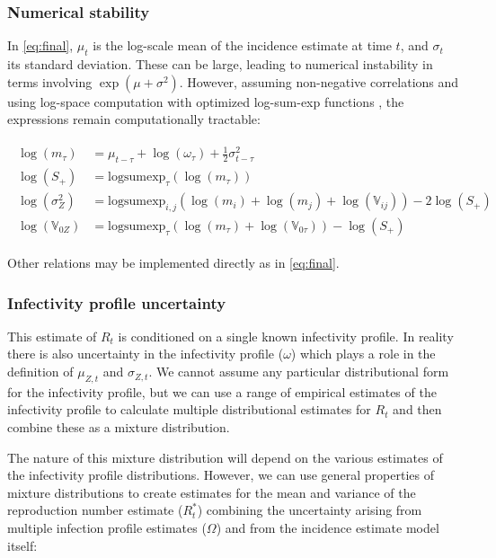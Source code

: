 \documentclass[10pt,letterpaper]{article}
\begin{document}
\subsubsection*{Numerical stability}

In \eqref{eq:final}, $\mu_t$ is the log-scale mean of the incidence estimate at time $t$, and $\sigma_t$ its standard deviation. These can be large, leading to numerical instability in terms involving $\exp(\mu + \sigma^2)$. However, assuming non-negative correlations and using log-space computation with optimized log-sum-exp functions \cite{blanchard2021}, the expressions remain computationally tractable:

\begin{eqnarray}
\begin{aligned}
\log(m_\tau) &= \mu_{t-\tau} + \log(\omega_\tau) + \frac{1}{2} \sigma_{t-\tau}^2 \\
\log(S_+) &= \text{logsumexp}_\tau(\log (m_\tau)) \\
\log(\sigma_Z^2) &= \text{logsumexp}_{i,j} \left( \log(m_i) + \log(m_j) + \log(\mathbb{V}_{ij}) \right) - 2 \log(S_+) \\
\log(\mathbb{V}_{0Z}) &= \text{logsumexp}_\tau \left( \log(m_\tau) + \log(\mathbb{V}_{0\tau}) \right) - \log(S_+)
\end{aligned}
\label{eq:logsumexp}
\end{eqnarray}

Other relations may be implemented directly as in \eqref{eq:final}.

\subsubsection*{Infectivity profile uncertainty}

This estimate of $R_t$ is conditioned on a single known infectivity profile. In reality there is also uncertainty in the infectivity profile ($\omega$) which plays a role in the definition of $\mu_{Z,t}$ and $\sigma_{Z,t}$. We cannot assume any particular distributional form for the infectivity profile, but we can use a range of empirical estimates of the infectivity profile to calculate multiple distributional estimates for $R_t$ and then combine these as a mixture distribution.

The nature of this mixture distribution will depend on the various estimates of the infectivity profile distributions. However, we can use general properties of mixture distributions to create estimates for the mean and variance of the reproduction number estimate ($R_t^*$) combining the uncertainty arising from multiple infection profile estimates ($\Omega$) and from the incidence estimate model itself:
\end{document}
